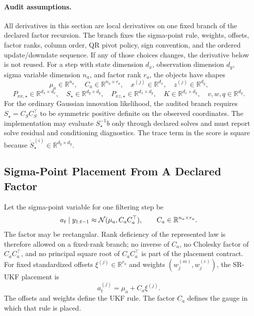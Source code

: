 \paragraph{Audit assumptions.}
\label{par:bf-srukf-audit-assumptions}
All derivatives in this section are local derivatives on one fixed branch of
the declared factor recursion.  The branch fixes the sigma-point rule, weights,
offsets, factor ranks, column order, QR pivot policy, sign convention, and the
ordered update/downdate sequence.  If any of those choices changes, the
derivative below is not reused.  For a step with state dimension \(d_x\),
observation dimension \(d_y\), sigma variable dimension \(n_a\), and factor
rank \(r_a\), the objects have shapes
\[
  \mu_a\in\mathbb R^{n_a},\quad
  C_a\in\mathbb R^{n_a\times r_a},\quad
  x^{(j)}\in\mathbb R^{d_x},\quad
  z^{(j)}\in\mathbb R^{d_y},
\]
\[
  P_{xx,\star}\in\mathbb R^{d_x\times d_x},\quad
  S_\star\in\mathbb R^{d_y\times d_y},\quad
  P_{xz,\star}\in\mathbb R^{d_x\times d_y},\quad
  K\in\mathbb R^{d_x\times d_y},\quad
  v,w,q\in\mathbb R^{d_y}.
\]
For the ordinary Gaussian innovation likelihood, the audited branch requires
\(S_\star=C_SC_S^\top\) to be symmetric positive definite on the observed
coordinates.  The implementation may evaluate \(S_\star^{-1}b\) only through
declared solves and must report solve residual and conditioning diagnostics.
The trace term in the score is square because
\(\dot S_\star^{(i)}\in\mathbb R^{d_y\times d_y}\).

\subsection{Sigma-Point Placement From A Declared Factor}
\label{sec:bf-srukf-factor-placement}

Let the sigma-point variable for one filtering step be
\[
  a_t\mid y_{1:t-1}\approx \mathcal{N}(\mu_a,C_aC_a^\top),
  \qquad
  C_a\in\mathbb R^{n_a\times r_a}.
\]
The factor may be rectangular.  Rank deficiency of the represented law is
therefore allowed on a fixed-rank branch; no inverse of \(C_a\), no Cholesky
factor of \(C_aC_a^\top\), and no principal square root of \(C_aC_a^\top\) is
part of the placement contract.  For fixed standardized offsets
\(\xi^{(j)}\in\mathbb R^{r_a}\) and weights
\((w_j^{(m)},w_j^{(c)})\), the SR-UKF placement is
\begin{equation}
\label{eq:bf-srukf-factor-placement}
  a_t^{(j)}=\mu_a+C_a\xi^{(j)} .
\end{equation}
The offsets and weights define the UKF rule.  The factor \(C_a\) defines the
gauge in which that rule is placed.

